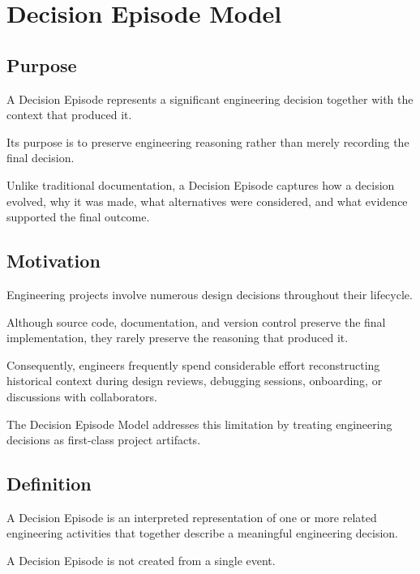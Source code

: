 \section{Decision Episode Model}

\subsection{Purpose}

A Decision Episode represents a significant engineering decision together with the context that produced it.

Its purpose is to preserve engineering reasoning rather than merely recording the final decision.

Unlike traditional documentation, a Decision Episode captures how a decision evolved, why it was made, what alternatives were considered, and what evidence supported the final outcome.

\vspace{0.5cm}

\subsection{Motivation}

Engineering projects involve numerous design decisions throughout their lifecycle.

Although source code, documentation, and version control preserve the final implementation, they rarely preserve the reasoning that produced it.

Consequently, engineers frequently spend considerable effort reconstructing historical context during design reviews, debugging sessions, onboarding, or discussions with collaborators.

The Decision Episode Model addresses this limitation by treating engineering decisions as first-class project artifacts.

\vspace{0.5cm}

\subsection{Definition}

A Decision Episode is an interpreted representation of one or more related engineering activities that together describe a meaningful engineering decision.

A Decision Episode is not created from a single event.

